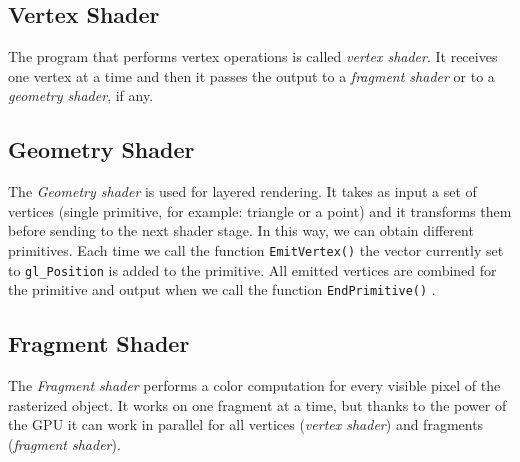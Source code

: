 \subsection{Vertex Shader}
The program that performs vertex operations is called \textit{vertex shader}. It receives one vertex at a time and then it passes the output to a \textit{fragment shader} or to a \textit{geometry shader}, if any.

\subsection{Geometry Shader}
The \textit{Geometry shader} is used for layered rendering. It takes as input a set of vertices (single primitive, for example: triangle or a point) and it transforms them before sending to the next shader stage. In this way, we can obtain different primitives.
Each time we call the function \texttt{EmitVertex()} the vector currently set to \texttt{gl\_Position} is added to the primitive. All emitted vertices are combined for the primitive and output when we call the function \texttt{EndPrimitive()} \cite{WEBSITE:learnopengl}.

\subsection{Fragment Shader}
The \textit{Fragment shader} performs a color computation for every visible pixel of the rasterized object. It works on one fragment at a time, but thanks to the power of the GPU it can work in parallel for all vertices (\textit{vertex shader}) and fragments (\textit{fragment shader}).

